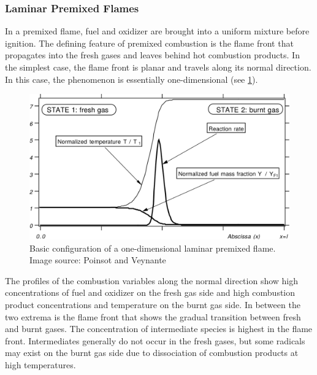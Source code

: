 \subsubsection{Laminar Premixed Flames} %
\label{ssub:laminar_premixed_flames}
%
In a premixed flame, fuel and oxidizer are brought into a uniform mixture before
ignition.
%
The defining feature of premixed combustion is the flame front that propagates
into the fresh gases and leaves behind hot combustion products.
%
In the simplest case, the flame front is planar and travels along its normal
direction.
%
In this case, the phenomenon is essentially one-dimensional (see
\cref{fig:premixed_profiles}).
%
\begin{figure}[t]
    \centering
    \includegraphics[width=\textwidth]{figures/1D_premixed_flame.png}
    \caption{Basic configuration of a one-dimensional laminar premixed flame.
    Image source: Poinsot and Veynante~\cite{Poinsot2012}}
    \label{fig:premixed_profiles}
\end{figure}
%
The profiles of the combustion variables along the normal direction show high
concentrations of fuel and oxidizer on the fresh gas side and high combustion
product concentrations and temperature on the burnt gas side.
%
In between the two extrema is the flame front that shows the gradual transition
between fresh and burnt gases.
%
The concentration of intermediate species is highest in the flame front.
%
Intermediates generally do not occur in the fresh gases, but some radicals may
exist on the burnt gas side due to dissociation of combustion products at high
temperatures.
%
